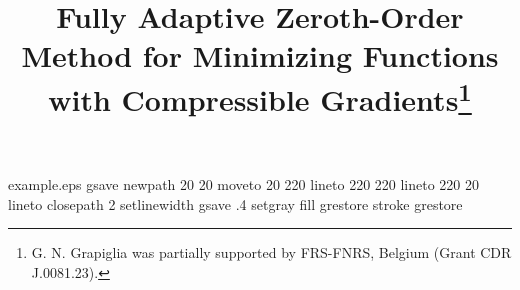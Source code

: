 %
%
%
%
%
\begin{filecontents*}{example.eps}
gsave
newpath
  20 20 moveto
  20 220 lineto
  220 220 lineto
  220 20 lineto
closepath
2 setlinewidth
gsave
  .4 setgray fill
grestore
stroke
grestore
\end{filecontents*}
%
\RequirePackage{fix-cm}
%
\documentclass{svjour3}                     %
\usepackage{amsmath,amsfonts}

%
\smartqed  %
%
\DeclareMathOperator{\argmin}{argmin}
\usepackage[table]{xcolor}
\usepackage{graphicx}
\usepackage[framemethod=tikz]{mdframed}
\usepackage{epstopdf}
\usepackage{hyperref}
\usepackage{subcaption}
\usepackage{multirow}
\usepackage{booktabs}
\usepackage{algpseudocode}
\usepackage{todonotes}


%
%
%
%
%


\title{Fully Adaptive Zeroth-Order Method for Minimizing Functions with Compressible Gradients\thanks{G. N. Grapiglia was partially supported by FRS-FNRS, Belgium (Grant CDR J.0081.23).}
}

